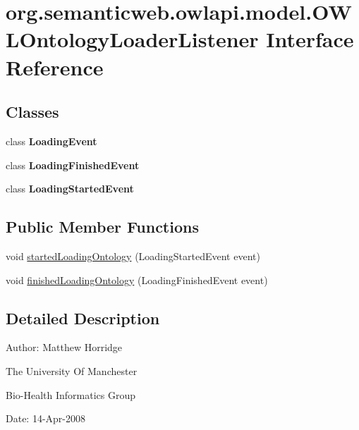 \hypertarget{interfaceorg_1_1semanticweb_1_1owlapi_1_1model_1_1_o_w_l_ontology_loader_listener}{\section{org.\-semanticweb.\-owlapi.\-model.\-O\-W\-L\-Ontology\-Loader\-Listener Interface Reference}
\label{interfaceorg_1_1semanticweb_1_1owlapi_1_1model_1_1_o_w_l_ontology_loader_listener}
}
\subsection*{Classes}
\begin{DoxyCompactItemize}
\item 
class {\bfseries Loading\-Event}
\item 
class {\bfseries Loading\-Finished\-Event}
\item 
class {\bfseries Loading\-Started\-Event}
\end{DoxyCompactItemize}
\subsection*{Public Member Functions}
\begin{DoxyCompactItemize}
\item 
void \hyperlink{interfaceorg_1_1semanticweb_1_1owlapi_1_1model_1_1_o_w_l_ontology_loader_listener_a4c9c34b133ff3f0d49a4c3872f0feada}{started\-Loading\-Ontology} (Loading\-Started\-Event event)
\item 
void \hyperlink{interfaceorg_1_1semanticweb_1_1owlapi_1_1model_1_1_o_w_l_ontology_loader_listener_a33f8549b82d165f2341ec7399ffd9f5e}{finished\-Loading\-Ontology} (Loading\-Finished\-Event event)
\end{DoxyCompactItemize}


\subsection{Detailed Description}
Author\-: Matthew Horridge\par
 The University Of Manchester\par
 Bio-\/\-Health Informatics Group\par
 Date\-: 14-\/\-Apr-\/2008\par
\par
 

